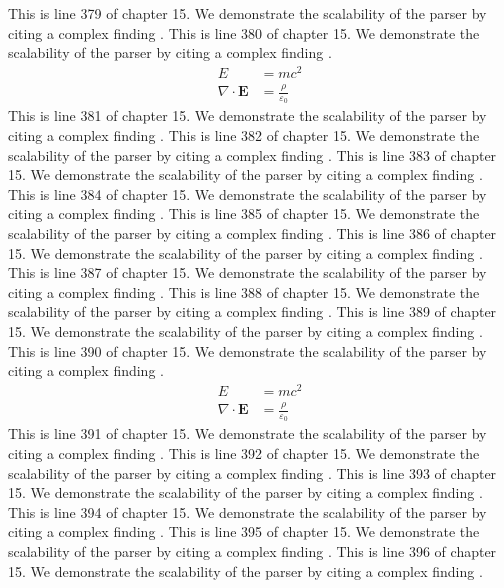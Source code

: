 This is line 379 of chapter 15. We demonstrate the scalability of the parser by citing a complex finding \cite{ref15_379}.
This is line 380 of chapter 15. We demonstrate the scalability of the parser by citing a complex finding \cite{ref15_380}.
\begin{align*}
  E &= mc^2 \\
  \nabla \cdot \mathbf{E} &= \frac{\rho}{\varepsilon_0}
\end{align*}
This is line 381 of chapter 15. We demonstrate the scalability of the parser by citing a complex finding \cite{ref15_381}.
This is line 382 of chapter 15. We demonstrate the scalability of the parser by citing a complex finding \cite{ref15_382}.
This is line 383 of chapter 15. We demonstrate the scalability of the parser by citing a complex finding \cite{ref15_383}.
This is line 384 of chapter 15. We demonstrate the scalability of the parser by citing a complex finding \cite{ref15_384}.
This is line 385 of chapter 15. We demonstrate the scalability of the parser by citing a complex finding \cite{ref15_385}.
This is line 386 of chapter 15. We demonstrate the scalability of the parser by citing a complex finding \cite{ref15_386}.
This is line 387 of chapter 15. We demonstrate the scalability of the parser by citing a complex finding \cite{ref15_387}.
This is line 388 of chapter 15. We demonstrate the scalability of the parser by citing a complex finding \cite{ref15_388}.
This is line 389 of chapter 15. We demonstrate the scalability of the parser by citing a complex finding \cite{ref15_389}.
This is line 390 of chapter 15. We demonstrate the scalability of the parser by citing a complex finding \cite{ref15_390}.
\begin{align*}
  E &= mc^2 \\
  \nabla \cdot \mathbf{E} &= \frac{\rho}{\varepsilon_0}
\end{align*}
This is line 391 of chapter 15. We demonstrate the scalability of the parser by citing a complex finding \cite{ref15_391}.
This is line 392 of chapter 15. We demonstrate the scalability of the parser by citing a complex finding \cite{ref15_392}.
This is line 393 of chapter 15. We demonstrate the scalability of the parser by citing a complex finding \cite{ref15_393}.
This is line 394 of chapter 15. We demonstrate the scalability of the parser by citing a complex finding \cite{ref15_394}.
This is line 395 of chapter 15. We demonstrate the scalability of the parser by citing a complex finding \cite{ref15_395}.
This is line 396 of chapter 15. We demonstrate the scalability of the parser by citing a complex finding \cite{ref15_396}.
